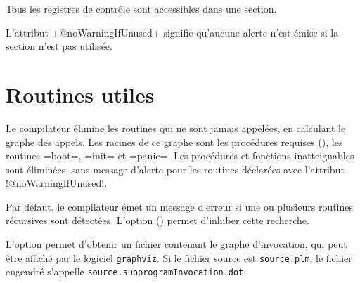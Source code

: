 
Tous les registres de contrôle sont accessibles dans une section.








L'attribut \plm+@noWarningIfUnused+ signifie qu'aucune alerte n'est émise si la section n'est pas utilisée.









\section{Routines utiles}

Le compilateur élimine les routines qui ne sont jamais appelées, en calculant le graphe des appels. Les racines de ce graphe sont les procédures requises (), les routines \plm=boot=, \plm=init= et \plm=panic=. Les procédures et fonctions inatteignables sont éliminées, sans message d'alerte pour les routines déclarées avec l'attribut \plm!@noWarningIfUnused!.












Par défaut, le compilateur émet un message d'erreur si une ou plusieurs routines récursives sont détectées. L'option  () permet d'inhiber cette recherche.

L'option  permet d'obtenir un fichier contenant le graphe d'invocation, qui peut être affiché par le logiciel \texttt{graphviz}. Si le fichier source est \texttt{source.plm}, le fichier engendré s'appelle \texttt{source.subprogramInvocation.dot}.

